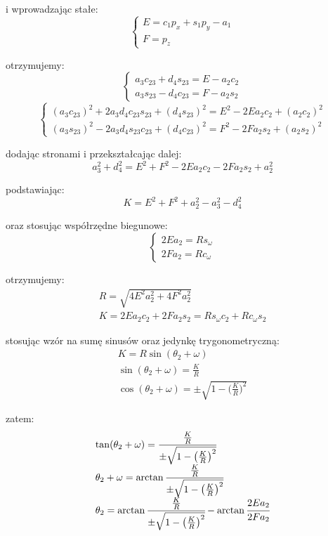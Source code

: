 \documentclass[]{article}
\begin{document}
i wprowadzając stałe:
\[\left\{\begin{array}{l}
E = c_1p_x + s_1p_y - a_1 \\
F = p_z
\end{array}\right.\]

otrzymujemy:
\[\left\{\begin{array}{l}
a_3c_{23} + d_4s_{23} = E - a_2c_2 \\
a_3s_{23} - d_4c_{23} = F - a_2s_2
\end{array}\right.\]
\[\left\{\begin{array}{l}
(a_3c_{23})^2 + 2a_3d_4c_{23}s_{23} + (d_4s_{23})^2 = E^2 - 2Ea_2c_2 + (a_2c_2)^2 \\
(a_3s_{23})^2 - 2a_3d_4s_{23}c_{23} + (d_4c_{23})^2 = F^2 - 2Fa_2s_2 + (a_2s_2)^2
\end{array}\right.\]

dodając stronami i przekształcając dalej:
\[
a_3^2 + d_4^2 = E^2 + F^2 - 2Ea_2c_2 - 2Fa_2s_2 + a_2^2
\]

podstawiając:
\[
K = E^2 + F^2 + a_2^2 - a_3^2 - d_4^2
\]

oraz stosując współrzędne biegunowe:
\[\left\{\begin{array}{l}
2Ea_2 = Rs_\omega \\
2Fa_2 = Rc_\omega
\end{array}\right.\]

otrzymujemy:
\[\begin{array}{l}
R = \sqrt{4E^2a_2^2 + 4F^2a_2^2} \\
K = 2Ea_2c_2 + 2Fa_2s_2 = Rs_\omega c_2 + Rc_\omega s_2
\end{array}\]

stosując wzór na sumę sinusów oraz jedynkę trygonometryczną:
\[\begin{array}{l}
K = R\sin(\theta_2 + \omega) \\
\sin(\theta_2 + \omega) = \frac{K}{R} \\
\cos(\theta_2 + \omega) = \pm \sqrt{1 - \big(\frac{K}{R}\big)^2}
\end{array}\]

zatem:
\[\begin{array}{l}
\tan(\theta_2 + \omega) = \cfrac{\frac{K}{R}}{\pm \sqrt{1 - \big(\frac{K}{R}\big)^2}} \\
\theta_2 + \omega = \arctan{\cfrac{\frac{K}{R}}{\pm \sqrt{1 - \big(\frac{K}{R}\big)^2}}} \\
\theta_2  = \arctan{\cfrac{\frac{K}{R}}{\pm \sqrt{1 - \big(\frac{K}{R}\big)^2}}} - \arctan{\cfrac{2Ea_2}{2Fa_2}} \\
\end{array}\]
\end{document}
